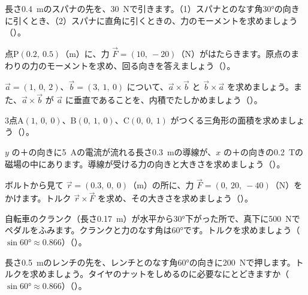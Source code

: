 \bkproblem 長さ\qty{0.4}{m}のスパナの先を、\qty{30}{N}で引きます。（1）スパナとのなす角30°の向きに引くとき、（2）スパナに直角に引くときの、力のモーメントを求めましょう（）。

\bkproblem 点P$(0.2,\ 0.5)$（m）に、力 $\vec F=(10,\ -20)$（N）がはたらきます。原点のまわりの力のモーメントを求め、回る向きを答えましょう（）。

\bkproblem $\vec a=(1,\ 0,\ 2)$、$\vec b=(3,\ 1,\ 0)$ について、$\vec a\times\vec b$ と $\vec b\times\vec a$ を求めましょう。また、$\vec a\times\vec b$ が $\vec a$ に垂直であることを、内積でたしかめましょう（）。

\bkproblem 3点A$(1,\ 0,\ 0)$、B$(0,\ 1,\ 0)$、C$(0,\ 0,\ 1)$ がつくる三角形の面積を求めましょう（）。


\bkproblem $y$ の＋の向きに\qty{5}{A}の電流が流れる長さ\qty{0.3}{m}の導線が、$x$ の＋の向きの\qty{0.2}{T}の磁場の中にあります。導線が受ける力の向きと大きさを求めましょう（）。

\bkproblem ボルトから見て $\vec r=(0.3,\ 0,\ 0)$（m）の所に、力 $\vec F=(0,\ 20,\ -40)$（N）をかけます。トルク $\vec r\times\vec F$ を求め、その大きさを求めましょう（）。

\bkproblem 自転車のクランク（長さ\qty{0.17}{m}）が水平から30°下がった所で、真下に\qty{500}{N}でペダルをふみます。クランクと力のなす角は60°です。トルクを求めましょう（$\sin60°\approx0.866$）（）。

\bkproblem 長さ\qty{0.5}{m}のレンチの先を、レンチとのなす角60°の向きに\qty{200}{N}で押します。トルクを求めましょう。タイヤのナットをしめるのに必要なにとどきますか（$\sin60°\approx0.866$）（）。

